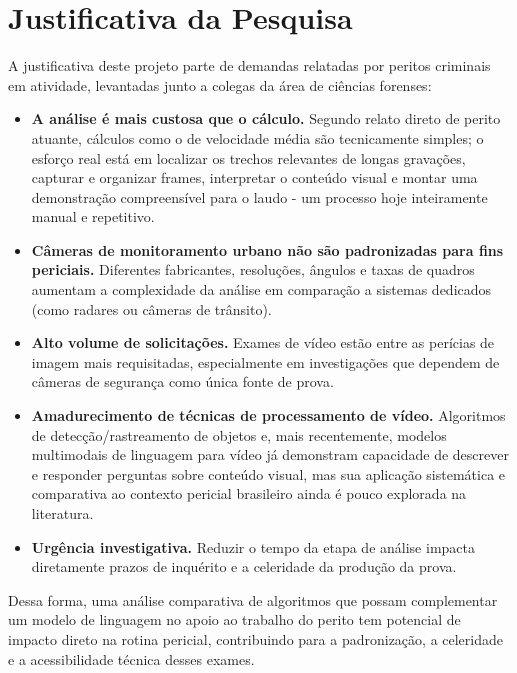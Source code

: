 \section*{Justificativa da Pesquisa}

A justificativa deste projeto parte de demandas relatadas por peritos criminais em atividade, levantadas junto a colegas da área de ciências forenses:

\begin{itemize}[leftmargin=1.5em]
    \item \textbf{A análise é mais custosa que o cálculo.} Segundo relato direto de perito atuante, cálculos como o de velocidade média são tecnicamente simples; o esforço real está em localizar os trechos relevantes de longas gravações, capturar e organizar frames, interpretar o conteúdo visual e montar uma demonstração compreensível para o laudo - um processo hoje inteiramente manual e repetitivo.
    \item \textbf{Câmeras de monitoramento urbano não são padronizadas para fins periciais.} Diferentes fabricantes, resoluções, ângulos e taxas de quadros aumentam a complexidade da análise em comparação a sistemas dedicados (como radares ou câmeras de trânsito).
    \item \textbf{Alto volume de solicitações.} Exames de vídeo estão entre as perícias de imagem mais requisitadas, especialmente em investigações que dependem de câmeras de segurança como única fonte de prova.
    \item \textbf{Amadurecimento de técnicas de processamento de vídeo.} Algoritmos de detecção/rastreamento de objetos e, mais recentemente, modelos multimodais de linguagem para vídeo já demonstram capacidade de descrever e responder perguntas sobre conteúdo visual, mas sua aplicação sistemática e comparativa ao contexto pericial brasileiro ainda é pouco explorada na literatura.
    \item \textbf{Urgência investigativa.} Reduzir o tempo da etapa de análise impacta diretamente prazos de inquérito e a celeridade da produção da prova.
\end{itemize}

Dessa forma, uma análise comparativa de algoritmos que possam complementar um modelo de linguagem no apoio ao trabalho do perito tem potencial de impacto direto na rotina pericial, contribuindo para a padronização, a celeridade e a acessibilidade técnica desses exames.
